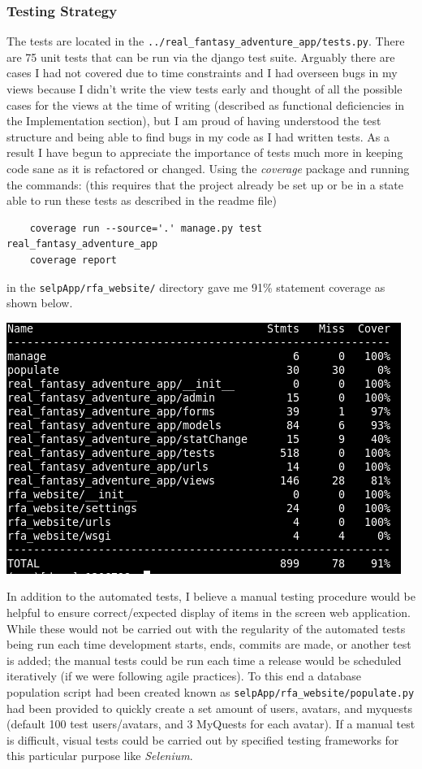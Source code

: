 \documentclass[11pt,a4paper]{article}
\begin{document}
\subsubsection{Testing Strategy}
The tests are located in the \verb|../real_fantasy_adventure_app/tests.py|. There are 75 unit tests that can be run via the django test suite. Arguably there are cases I had not covered due to time constraints and I had overseen bugs in my views because I didn't write the view tests early and thought of all the possible cases for the views at the time of writing (described as functional deficiencies in the Implementation section), but I am proud of having understood the test structure and being able to find bugs in my code as I had written tests. As a result I have begun to appreciate the importance of tests much more in keeping code sane as it is refactored or changed. Using the \textit{coverage} package and running the commands: (this requires that the project already be set up or be in a state able to run these tests as described in the readme file)

\begin{verbatim}
	coverage run --source='.' manage.py test real_fantasy_adventure_app
	coverage report
\end{verbatim}

in the \verb|selpApp/rfa_website/| directory gave me 91\% statement coverage as shown below.

\begin{center}
\includegraphics[scale=0.5]{selpTestCoverage.png} \\
\end{center}

In addition to the automated tests, I believe a manual testing procedure would be helpful to ensure correct/expected display of items in the screen web application. While these would not be carried out with the regularity of the automated tests being run each time development starts, ends, commits are made, or another test is added; the manual tests could be run each time a release would be scheduled iteratively (if we were following agile practices). To this end a database population script had been created known as \verb|selpApp/rfa_website/populate.py| had been provided to quickly create a set amount of users, avatars, and myquests (default 100 test users/avatars, and 3 MyQuests for each avatar). If a manual test is difficult, visual tests could be carried out by specified testing frameworks for this particular purpose like \textit{Selenium}.
\end{document}
